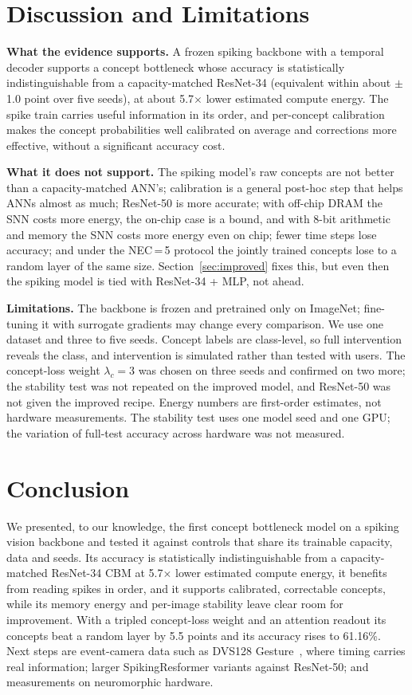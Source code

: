 \documentclass[conference]{IEEEtran}
\begin{document}
\section{Discussion and Limitations}\label{sec:disc}

\textbf{What the evidence supports.} A frozen spiking backbone with a temporal decoder supports a concept bottleneck whose accuracy is statistically indistinguishable from a capacity-matched ResNet-34 (equivalent within about $\pm$1.0 point over five seeds), at about 5.7$\times$ lower estimated compute energy. The spike train carries useful information in its order, and per-concept calibration makes the concept probabilities well calibrated on average and corrections more effective, without a significant accuracy cost.

\textbf{What it does not support.} The spiking model's raw concepts are not better than a capacity-matched ANN's; calibration is a general post-hoc step that helps ANNs almost as much; ResNet-50 is more accurate; with off-chip DRAM the SNN costs more energy, the on-chip case is a bound, and with 8-bit arithmetic and memory the SNN costs more energy even on chip; fewer time steps lose accuracy; and under the NEC\,=\,5 protocol the jointly trained concepts lose to a random layer of the same size. Section~\ref{sec:improved} fixes this, but even then the spiking model is tied with ResNet-34 + MLP, not ahead.

\textbf{Limitations.} The backbone is frozen and pretrained only on ImageNet; fine-tuning it with surrogate gradients may change every comparison. We use one dataset and three to five seeds. Concept labels are class-level, so full intervention reveals the class, and intervention is simulated rather than tested with users. The concept-loss weight $\lambda_c=3$ was chosen on three seeds and confirmed on two more; the stability test was not repeated on the improved model, and ResNet-50 was not given the improved recipe. Energy numbers are first-order estimates, not hardware measurements. The stability test uses one model seed and one GPU; the variation of full-test accuracy across hardware was not measured.

\section{Conclusion}
We presented, to our knowledge, the first concept bottleneck model on a spiking vision backbone and tested it against controls that share its trainable capacity, data and seeds. Its accuracy is statistically indistinguishable from a capacity-matched ResNet-34 CBM at 5.7$\times$ lower estimated compute energy, it benefits from reading spikes in order, and it supports calibrated, correctable concepts, while its memory energy and per-image stability leave clear room for improvement. With a tripled concept-loss weight and an attention readout its concepts beat a random layer by 5.5 points and its accuracy rises to 61.16\%. Next steps are event-camera data such as DVS128 Gesture~\cite{amir2017low}, where timing carries real information; larger SpikingResformer variants against ResNet-50; and measurements on neuromorphic hardware.
\end{document}
